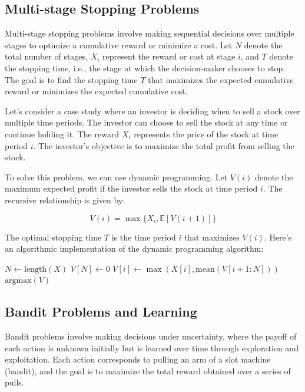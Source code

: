 \documentclass[12pt]{book} %
\begin{document}
\subsection{Multi-stage Stopping Problems}

Multi-stage stopping problems involve making sequential decisions over multiple stages to optimize a cumulative reward or minimize a cost. Let \(N\) denote the total number of stages, \(X_i\) represent the reward or cost at stage \(i\), and \(T\) denote the stopping time, i.e., the stage at which the decision-maker chooses to stop. The goal is to find the stopping time \(T\) that maximizes the expected cumulative reward or minimizes the expected cumulative cost.

Let's consider a case study where an investor is deciding when to sell a stock over multiple time periods. The investor can choose to sell the stock at any time or continue holding it. The reward \(X_i\) represents the price of the stock at time period \(i\). The investor's objective is to maximize the total profit from selling the stock.

To solve this problem, we can use dynamic programming. Let \(V(i)\) denote the maximum expected profit if the investor sells the stock at time period \(i\). The recursive relationship is given by:

\[
V(i) = \max\{X_i, \mathbb{E}[V(i+1)]\}
\]

The optimal stopping time \(T\) is the time period \(i\) that maximizes \(V(i)\). Here's an algorithmic implementation of the dynamic programming algorithm:
\FloatBarrier
\begin{algorithm}
\caption{Multi-stage Stopping Problem}\label{multi_stage}
\begin{algorithmic}[1]
\State $N \gets \text{length}(X)$
\State $V[N] \gets 0$
    \State $V[i] \gets \max(X[i], \text{mean}(V[i+1:N]))$
\EndFor
\State \Return $\text{argmax}(V)$
\EndFunction
\end{algorithmic}
\end{algorithm}
\FloatBarrier
\subsection{Bandit Problems and Learning}

Bandit problems involve making decisions under uncertainty, where the payoff of each action is unknown initially but is learned over time through exploration and exploitation. Each action corresponds to pulling an arm of a slot machine (bandit), and the goal is to maximize the total reward obtained over a series of pulls.
\end{document}
